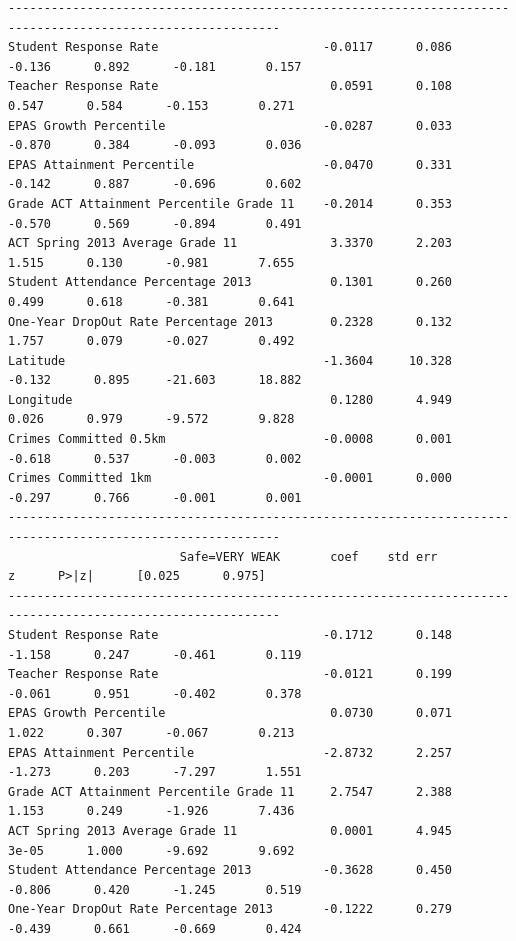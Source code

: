 \documentclass[11pt]{article}
\newcommand{\1}{\mathds{1}}
\begin{document}
\begin{Verbatim}[fontsize=\tiny]
------------------------------------------------------------------------------------------------------------
Student Response Rate                       -0.0117      0.086     -0.136      0.892      -0.181       0.157
Teacher Response Rate                        0.0591      0.108      0.547      0.584      -0.153       0.271
EPAS Growth Percentile                      -0.0287      0.033     -0.870      0.384      -0.093       0.036
EPAS Attainment Percentile                  -0.0470      0.331     -0.142      0.887      -0.696       0.602
Grade ACT Attainment Percentile Grade 11    -0.2014      0.353     -0.570      0.569      -0.894       0.491
ACT Spring 2013 Average Grade 11             3.3370      2.203      1.515      0.130      -0.981       7.655
Student Attendance Percentage 2013           0.1301      0.260      0.499      0.618      -0.381       0.641
One-Year DropOut Rate Percentage 2013        0.2328      0.132      1.757      0.079      -0.027       0.492
Latitude                                    -1.3604     10.328     -0.132      0.895     -21.603      18.882
Longitude                                    0.1280      4.949      0.026      0.979      -9.572       9.828
Crimes Committed 0.5km                      -0.0008      0.001     -0.618      0.537      -0.003       0.002
Crimes Committed 1km                        -0.0001      0.000     -0.297      0.766      -0.001       0.001
------------------------------------------------------------------------------------------------------------
                    	Safe=VERY WEAK       coef    std err          z      P>|z|      [0.025      0.975]
------------------------------------------------------------------------------------------------------------
Student Response Rate                       -0.1712      0.148     -1.158      0.247      -0.461       0.119
Teacher Response Rate                       -0.0121      0.199     -0.061      0.951      -0.402       0.378
EPAS Growth Percentile                       0.0730      0.071      1.022      0.307      -0.067       0.213
EPAS Attainment Percentile                  -2.8732      2.257     -1.273      0.203      -7.297       1.551
Grade ACT Attainment Percentile Grade 11     2.7547      2.388      1.153      0.249      -1.926       7.436
ACT Spring 2013 Average Grade 11             0.0001      4.945      3e-05      1.000      -9.692       9.692
Student Attendance Percentage 2013          -0.3628      0.450     -0.806      0.420      -1.245       0.519
One-Year DropOut Rate Percentage 2013       -0.1222      0.279     -0.439      0.661      -0.669       0.424

\end{Verbatim}
\end{document}
